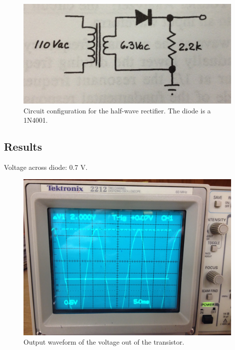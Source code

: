 \documentclass[12pt,letterpaper]{report}
\newlength \figwidth
\begin{document}
\begin{figure}[H]
\centering
\includegraphics[width=\figwidth, keepaspectratio=true]{lab4/circuit_1.jpg}
\caption{Circuit configuration for the half-wave rectifier. The diode is a 1N4001.}
\label{fig:circuit_1}
\end{figure}

\subsection*{Results}

Voltage across diode: 0.7 V.

\begin{figure}[H]
\centering
\includegraphics[width=\figwidth, keepaspectratio=true]{lab4/3_2_transformer.jpg}
\caption{Output waveform of the voltage out of the transistor.}
\label{fig:3.2_transformer}
\end{figure}
\end{document}
